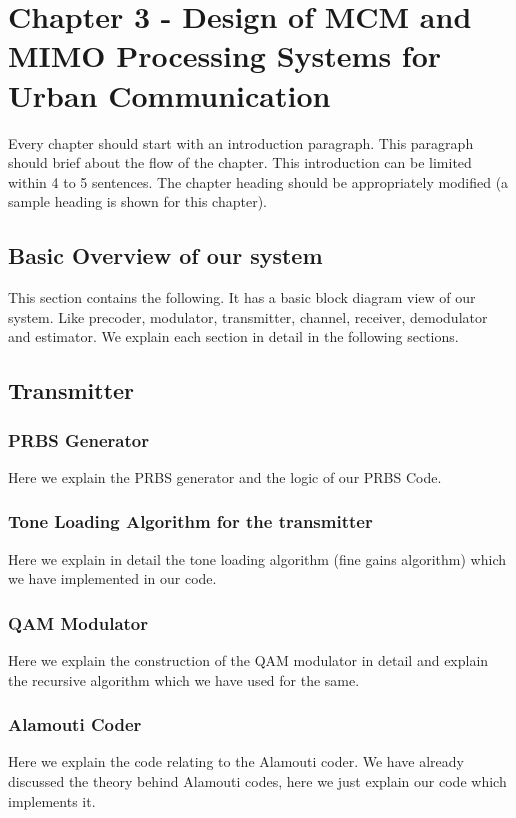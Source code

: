 \chapter{Chapter 3 - Design of MCM and MIMO Processing Systems for Urban Communication}

Every chapter should start with an introduction paragraph. This paragraph should brief about the flow of the chapter. This introduction can be limited within 4 to 5 sentences. The chapter heading should be appropriately modified (a sample heading is shown for this chapter).
 
\section{Basic Overview of our system}
This section contains the following. It has a basic block diagram view of our system. Like precoder, modulator, transmitter, channel, receiver, demodulator and estimator. We explain each section in detail in the following sections.


\section{Transmitter}

\subsection{PRBS Generator}
Here we explain the PRBS generator and the logic of our PRBS Code.

\subsection{Tone Loading Algorithm for the transmitter}
Here we explain in detail the tone loading algorithm (fine gains algorithm) which we have implemented in our code.

\subsection{QAM Modulator}
Here we explain the construction of the QAM modulator in detail and explain the recursive algorithm which we have used for the same.

\subsection{Alamouti Coder}
Here we explain the code relating to the Alamouti coder. We have already discussed the theory behind Alamouti codes, here we just explain our code which implements it.


